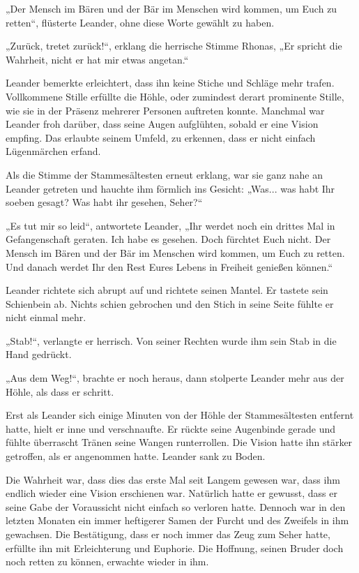 \documentclass[10pt, a4paper, oneside]{book}
\begin{document}
„Der Mensch im Bären und der Bär im Menschen wird kommen, um Euch zu retten“, flüsterte Leander, ohne diese Worte gewählt zu haben.

„Zurück, tretet zurück!“, erklang die herrische Stimme Rhonas, „Er spricht die Wahrheit, nicht er hat mir etwas angetan.“

Leander bemerkte erleichtert, dass ihn keine Stiche und Schläge mehr trafen. Vollkommene Stille erfüllte die Höhle, oder zumindest derart prominente Stille, wie sie in der Präsenz mehrerer Personen auftreten konnte. Manchmal war Leander froh darüber, dass seine Augen aufglühten, sobald er eine Vision empfing. Das erlaubte seinem Umfeld, zu erkennen, dass er nicht einfach Lügenmärchen erfand.

Als die Stimme der Stammesältesten erneut erklang, war sie ganz nahe an Leander getreten und hauchte ihm förmlich ins Gesicht: „Was... was habt Ihr soeben gesagt? Was habt ihr gesehen, Seher?“

„Es tut mir so leid“, antwortete Leander, „Ihr werdet noch ein drittes Mal in Gefangenschaft geraten. Ich habe es gesehen. Doch fürchtet Euch nicht. Der Mensch im Bären und der Bär im Menschen wird kommen, um Euch zu retten. Und danach werdet Ihr den Rest Eures Lebens in Freiheit genießen können.“

Leander richtete sich abrupt auf und richtete seinen Mantel. Er tastete sein Schienbein ab. Nichts schien gebrochen und den Stich in seine Seite fühlte er nicht einmal mehr.

„Stab!“, verlangte er herrisch. Von seiner Rechten wurde ihm sein Stab in die Hand gedrückt.

„Aus dem Weg!“, brachte er noch heraus, dann stolperte Leander mehr aus der Höhle, als dass er schritt.\bigskip







Erst als Leander sich einige Minuten von der Höhle der Stammesältesten entfernt hatte, hielt er inne und verschnaufte. Er rückte seine Augenbinde gerade und fühlte überrascht Tränen seine Wangen runterrollen. Die Vision hatte ihn stärker getroffen, als er angenommen hatte. Leander sank zu Boden.

Die Wahrheit war, dass dies das erste Mal seit Langem gewesen war, dass ihm endlich wieder eine Vision erschienen war. Natürlich hatte er gewusst, dass er seine Gabe der Voraussicht nicht einfach so verloren hatte. Dennoch war in den letzten Monaten ein immer heftigerer Samen der Furcht und des Zweifels in ihm gewachsen. Die Bestätigung, dass er noch immer das Zeug zum Seher hatte, erfüllte ihn mit Erleichterung und Euphorie. Die Hoffnung, seinen Bruder doch noch retten zu können, erwachte wieder in ihm.
\end{document}
